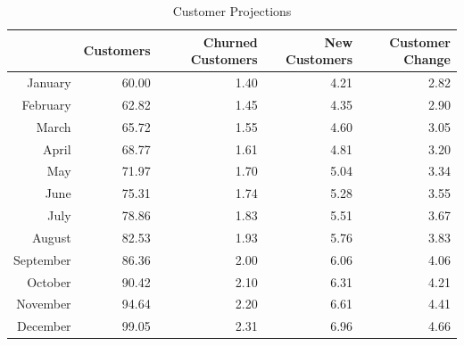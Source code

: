 \documentclass[11pt]{article}
\begin{document}
\begin{table}[ht]
\centering
\begin{tabularx}{\textwidth}{rrrrr}
  \hline
 & Customers & Churned Customers & New Customers &  Customer Change \\ 
  \hline
January & 60.00 & 1.40 & 4.21 & 2.82 \\ 
  February & 62.82 & 1.45 & 4.35 & 2.90 \\ 
  March & 65.72 & 1.55 & 4.60 & 3.05 \\ 
  April & 68.77 & 1.61 & 4.81 & 3.20 \\ 
  May & 71.97 & 1.70 & 5.04 & 3.34 \\ 
  June & 75.31 & 1.74 & 5.28 & 3.55 \\ 
  July & 78.86 & 1.83 & 5.51 & 3.67 \\ 
  August & 82.53 & 1.93 & 5.76 & 3.83 \\ 
  September & 86.36 & 2.00 & 6.06 & 4.06 \\ 
  October & 90.42 & 2.10 & 6.31 & 4.21 \\ 
  November & 94.64 & 2.20 & 6.61 & 4.41 \\ 
  December & 99.05 & 2.31 & 6.96 & 4.66 \\ 
   \hline
\end{tabularx}
\caption{Customer Projections} 
\label{tabcp}
\end{table}
\end{document}
